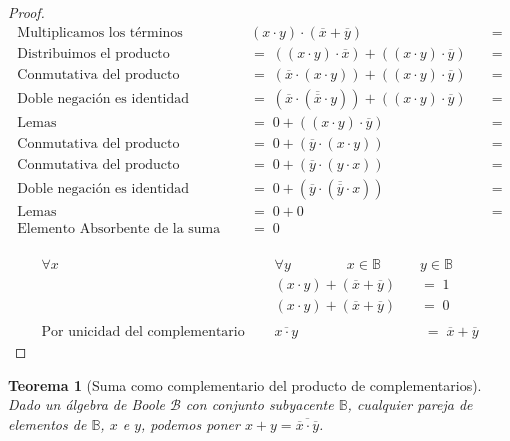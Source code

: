 \documentclass[final,12pt,a4paper,twoside,fleqn]{extbook}
\newcommand{\setB}{\ensuremath{\mathbb{B}}}
\newtheorem{thm}{Teorema}[chapter]
\theoremstyle{definition}
\theoremstyle{remark}
\begin{document}
\begin{proof}
\begin{align}
\text{Multiplicamos los términos }\quad& \left( { x \cdot y } \right) \cdot \left( \overline{x} + \overline{y} \right) \quad&=\\
\text{Distribuimos el producto }\quad&=\; \left( \left( x \cdot y \right) \cdot \overline{x} \right) + \left( \left( x \cdot y \right) \cdot \overline{y} \right) \quad&=\\
\text{Conmutativa del producto }\quad&=\; \left( \overline{x} \cdot \left( x \cdot y \right) \right) + \left( \left( x \cdot y \right) \cdot \overline{y} \right) \quad&=\\ 
\text{Doble negación es identidad }\quad&=\; \left( \overline{x} \cdot \left( \overline{\overline{x}} \cdot y \right) \right) + \left( \left( x \cdot y \right) \cdot \overline{y} \right) \quad&=\\ 
\text{Lemas }\quad&=\; 0 + \left( \left( x \cdot y \right) \cdot \overline{y} \right) \quad&=\\
\text{Conmutativa del producto }\quad&=\; 0 + \left( \overline{y} \cdot \left( x \cdot y \right) \right) \quad&=\\
\text{Conmutativa del producto }\quad&=\; 0 + \left( \overline{y} \cdot \left( y \cdot x \right) \right) \quad&=\\
\text{Doble negación es identidad }\quad&=\; 0 + \left( \overline{y} \cdot \left( \overline{\overline{y}} \cdot x \right) \right) \quad&=\\
\text{Lemas }\quad&=\; 0 + 0 \quad&=\\
\text{Elemento Absorbente de la suma }\quad&=\; 0 &\\
\end{align}



\begin{align}
\forall x \qquad& \forall y \qquad \qquad x \in \setB \qquad& y \in \setB\\
{} & \left( x \cdot y \right) + \left( \overline{x} + \overline{y} \right) \;&=\; 1\\
{} & \left( x \cdot y \right) + \left( \overline{x} + \overline{y} \right) \;&=\; 0\\
\\ \nonumber
\text{Por unicidad del complementario }\quad&\overline{ {x \cdot y} } &\;=\; \overline{x} + \overline{y}
\end{align}
\end{proof}



\begin{thm}[Suma como complementario del producto de complementarios]
Dado un álgebra de Boole \(\mathscr{B}\) con conjunto subyacente \(\setB\), cualquier pareja de elementos de \(\setB\), \(x\) e \(y\), podemos poner \(x+y=\overline{\overline{x}\cdot\overline{y}}\).
\end{thm}
\end{document}
